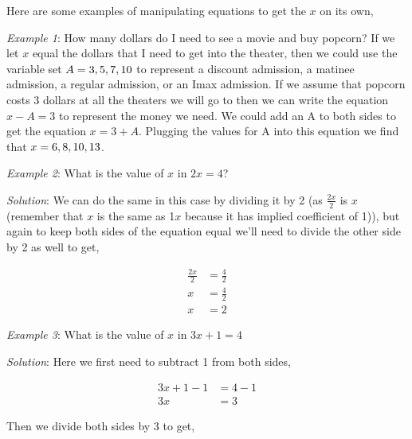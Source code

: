 Here are some examples of manipulating equations to get the $x$ on its own,



\textit{Example 1}: How many dollars do I need to see a movie and buy popcorn? If we let $x$ equal the dollars that I need to get into the theater, then we could use the variable set $A=\\{3,5,7,10\\}$ to represent a discount admission, a matinee admission, a regular admission, or an Imax admission. If we assume that popcorn costs 3 dollars at all the theaters we will go to then we can write the equation $x - A = 3$ to represent the money we need. We could add an A to both sides to get the equation $x = 3 + A$. Plugging the values for A into this equation we find that $x= \\{6, 8, 10, 13\\}$.



\textit{Example 2}: What is the value of $x$ in $2x = 4$?



\textit{Solution}: We can do the same in this case by dividing it by 2 (as $\frac{2x}{2}$ is $x$ (remember that $x$ is the same as 1$x$ because it has implied coefficient of 1)), but again to keep both sides of the equation equal we'll need to divide the other side by 2 as well to get,



\begin{align}
\frac{2x}{2} & = \frac{4}{2} \\
x & = \frac{4}{2} \\
x & = 2
\end{align}





\textit{Example 3}: What is the value of $x$ in $3x + 1 = 4$



\textit{Solution}: Here we first need to subtract 1 from both sides,



\begin{align}
3x + 1 - 1 & = 4 - 1 \\
3x & = 3
\end{align}





Then we divide both sides by 3 to get,



